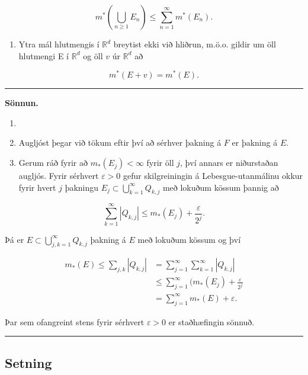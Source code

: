 \documentclass[]{book}
\providecommand{\tightlist}{%
  \setlength{\itemsep}{0pt}\setlength{\parskip}{0pt}}
\begin{document}
\[
m^*(\bigcup_{n\geq 1}E_n) \leq \sum_{n=1}^\infty m^*(E_n).
\]

\begin{enumerate}
\def\labelenumi{\arabic{enumi}.}
\setcounter{enumi}{3}
\tightlist
\item
  Ytra mál hlutmengis í \(\mathbb R^d\) breytist ekki við hliðrun, m.ö.o. gildir um öll hlutmengi E í \(\mathbb R^d\) og öll \(v\) úr \(\mathbb R^d\) að
\end{enumerate}

\[
m^*(E + v) = m^*(E).
\]

\begin{center}\rule{0.5\linewidth}{\linethickness}\end{center}

\textbf{Sönnun.}

\begin{enumerate}
\def\labelenumi{\arabic{enumi}.}
\item
\item
  Augljóst þegar við tökum eftir því að sérhver þakning á \(F\) er þakning á \(E\).
\item
  Gerum ráð fyrir að \(m_*(E_j) < \infty\) fyrir öll \(j\), því annars er niðurstaðan augljós. Fyrir sérhvert \(\varepsilon > 0\) gefur skilgreiningin á Lebesgue-utanmálinu okkur fyrir hvert \(j\) þakningu \(E_j\subset \bigcup_{k=1}^\infty Q_{k,j}\) með lokuðum kössum þannig að
\end{enumerate}

\[
\sum_{k=1}^\infty |Q_{k,j}| \leq m_*(E_j) + \frac{\varepsilon}{2^j}.
\]

Þá er \(E\subset\bigcup_{j,k=1}^\infty Q_{k,j}\) þakning á \(E\) með lokuðum kössum og því

\[
\begin{aligned}
m_*(E) \leq \sum_{j,k}|Q_{k,j}| &= \sum_{j=1}^\infty\sum_{k=1}^\infty |Q_{k,j}| \\
&\leq \sum_{j=1}^\infty
(m_*(E_j) + \frac{\varepsilon}{2^j} \\
&= \sum_{j=1}^\infty m_*(E) + \varepsilon.
\end{aligned}
\]

Þar sem ofangreint stens fyrir sérhvert \(\varepsilon > 0\) er staðhæfingin sönnuð.

\begin{center}\rule{0.5\linewidth}{\linethickness}\end{center}

\hypertarget{setning-19}{%
\subsection{Setning}\label{setning-19}}
\end{document}
